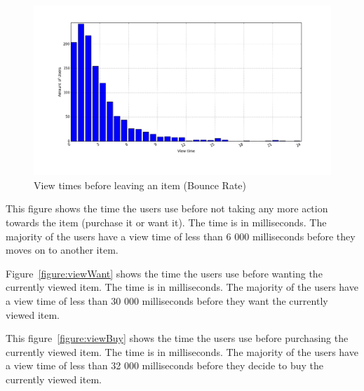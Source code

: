     \begin{figure}[H]
        \includegraphics[width=5in]{image/product_detail_clickeddistribution.png}
        \centering
        \caption{View times before leaving an item (Bounce Rate)}
    \label{figure:bounceRate}
    \end{figure}

        This figure shows the time the users use before not taking any more action towards the item (purchase it or want it).
        The time is in milliseconds.
        The majority of the users have a view time of less than 6 000 milliseconds before they moves on to another item.

        Figure~\ref{figure:viewWant} shows the time the users use before wanting the currently viewed item.
        The time is in milliseconds.
        The majority of the users have a view time of less than 30 000 milliseconds before they want the currently viewed item.

        This figure~\ref{figure:viewBuy} shows the time the users use before purchasing the currently viewed item.
        The time is in milliseconds.
        The majority of the users have a view time of less than 32 000 milliseconds before they decide to buy the currently viewed item.

